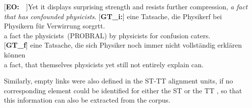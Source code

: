 \documentclass[output=paper]{LSP/langsci}
\begin{document}
\ea
\begin{xlist}
\exi{}[\textbf{EO:}~~]{Yet it displays surprising strength and resists further compression, \emph{a fact that has confounded physicists}.}
\exi{}[\textbf{GT\_i:}]{
\gll \raute\stern\stern{} eine{\raute} Tatsache,{\raute} die{\raute} Physikerf\raute\stern\pfeil\pfeil\raute{\color{red}[{\stern}11.968]}\pfeil\pfeil\pfeil\pfeil\pfeil\pfeil\pfeil\pfeil\pfeil{} bei\raute{} Physikern\raute{} für\raute{} Verwirrung\raute{} sorgrt\pfeil\pfeil{}t.\\
 {} a fact the physicists~(PROBRAL) by physicists for confusion caters.\\
}
\exi{}[\textbf{GT\_f}]{
\gll  eine Tatsache, die sich Physiker noch immer nicht vollständig erklären können\\
  a fact, that themselves physicists yet still not entirely explain can.\\
}
\end{xlist}
\z

Similarly, empty links were also defined in the ST-TT alignment units, if no corresponding element could be identified for either the ST or the TT \citep{Culo2012}, so that this information can also be extracted from the corpus.    
\end{document}
